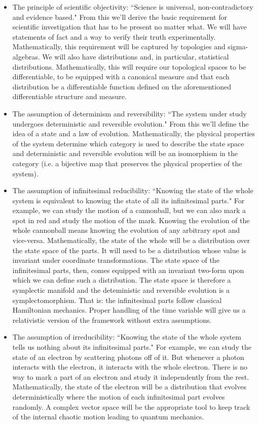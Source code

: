 \documentclass[11pt,letterpaper,fleqn]{memoir} %
\begin{document}
\begin{itemize}
	\item The principle of scientific objectivity: ``Science is universal, non-contradictory and evidence based." From this we'll derive the basic requirement for scientific investigation that has to be present no matter what. We will have statements of fact and a way to verify their truth experimentally. Mathematically, this requirement will be captured by topologies and sigma-algebras. We will also have distributions and, in particular, statistical distributions. Mathematically, this will require our topological spaces to be differentiable, to be equipped with a canonical measure and that each distribution be a differentiable function defined on the aforementioned differentiable structure and measure.
	\item The assumption of determinism and reversibility: ``The system under study undergoes deterministic and reversible evolution." From this we'll define the idea of a state and a law of evolution. Mathematically, the physical properties of the system determine which category is used to describe the state space and deterministic and reversible evolution will be an isomorphism in the category (i.e. a bijective map that preserves the physical properties of the system).
	\item The assumption of infinitesimal reducibility: ``Knowing the state of the whole system is equivalent to knowing the state of all its infinitesimal parts." For example, we can study the motion of a cannonball, but we can also mark a spot in red and study the motion of the mark. Knowing the evolution of the whole cannonball means knowing the evolution of any arbitrary spot and vice-versa. Mathematically, the state of the whole will be a distribution over the state space of the parts. It will need to be a distribution whose value is invariant under coordinate transformations. The state space of the infinitesimal parts, then, comes equipped with an invariant two-form upon which we can define such a distribution. The state space is therefore a symplectic manifold and the deteministic and reversible evolution is a symplectomorphism. That is: the infinitesimal parts follow classical Hamiltonian mechanics. Proper handling of the time variable will give us a relativistic version of the framework without extra assumptions. 
	\item The assumption of irreducibility: ``Knowing the state of the whole system tells us nothing about its infinitesimal parts." For example, we can study the state of an electron by scattering photons off of it. But whenever a photon interacts with the electron, it interacts with the whole electron. There is no way to mark a part of an electron and study it independently from the rest. Mathematically, the state of the electron will be a distribution that evolves deterministically where the motion of each infinitesimal part evolves randomly. A complex vector space will be the appropriate tool to keep track of the internal chaotic motion leading to quantum mechanics.

\end{itemize}
\end{document}
